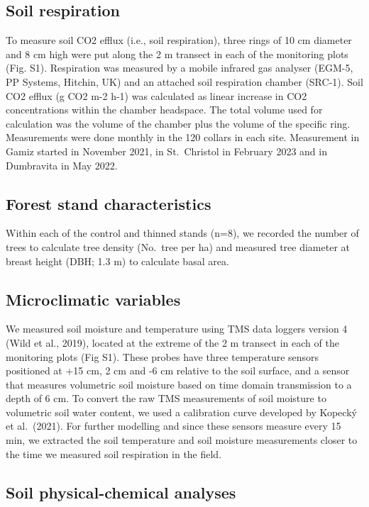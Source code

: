 \documentclass[
]{article}
\begin{document}
\subsection{Soil respiration}\label{soil-respiration}

To measure soil CO2 efflux (i.e., soil respiration), three rings of 10 cm diameter and 8 cm high were put along the 2 m transect in each of the monitoring plots (Fig. S1). Respiration was measured by a mobile infrared gas analyser (EGM-5, PP Systems, Hitchin, UK) and an attached soil respiration chamber (SRC-1). Soil CO2 efflux (g CO2 m-2 h-1) was calculated as linear increase in CO2 concentrations within the chamber headspace. The total volume used for calculation was the volume of the chamber plus the volume of the specific ring. Measurements were done monthly in the 120 collars in each site. Measurement in Gamiz started in November 2021, in St.~Christol in February 2023 and in Dumbravita in May 2022.

\subsection{Forest stand characteristics}\label{forest-stand-characteristics}

Within each of the control and thinned stands (n=8), we recorded the number of trees to calculate tree density (No.~tree per ha) and measured tree diameter at breast height (DBH; 1.3 m) to calculate basal area.

\subsection{Microclimatic variables}\label{microclimatic-variables}

We measured soil moisture and temperature using TMS data loggers version 4 (Wild et al., 2019), located at the extreme of the 2 m transect in each of the monitoring plots (Fig S1). These probes have three temperature sensors positioned at +15 cm, 2 cm and -6 cm relative to the soil surface, and a sensor that measures volumetric soil moisture based on time domain transmission to a depth of 6 cm. To convert the raw TMS measurements of soil moisture to volumetric soil water content, we used a calibration curve developed by Kopecký et al.~(2021). For further modelling and since these sensors measure every 15 min, we extracted the soil temperature and soil moisture measurements closer to the time we measured soil respiration in the field.

\subsection{Soil physical-chemical analyses}\label{soil-physical-chemical-analyses}
\end{document}

